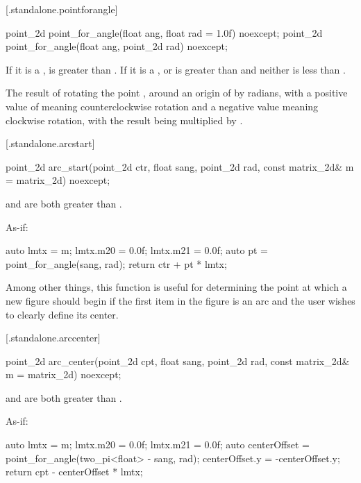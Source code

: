  [\iotwod.standalone.pointforangle] {}

%
\begin{itemdecl}
point_2d point_for_angle(float ang, float rad = 1.0f) noexcept;
point_2d point_for_angle(float ang, point_2d rad) noexcept;
\end{itemdecl}
\begin{itemdescr}
\pnum
\requires
If it is a ,  is greater than . If it is a ,  or  is greater than  and neither is less than .

\pnum
\returns
The result of rotating the point , around an origin of  by  radians, with a positive value of  meaning counterclockwise rotation and a negative value meaning clockwise rotation, with the result being multiplied by .
\end{itemdescr}

 [\iotwod.standalone.arcstart] {}

%
\begin{itemdecl}
point_2d arc_start(point_2d ctr, float sang, point_2d rad, 
  const matrix_2d& m = matrix_2d{}) noexcept;
\end{itemdecl}
\begin{itemdescr}
\pnum
\requires
{} and  are both greater than .

\pnum
\returns
As-if:
\begin{codeblock}
auto lmtx = m;
lmtx.m20 = 0.0f; lmtx.m21 = 0.0f;
auto pt = point_for_angle(sang, rad);
return ctr + pt * lmtx;
\end{codeblock}

\pnum
\begin{note}
Among other things, this function is useful for determining the point at which a new figure should begin if the first item in the figure is an arc and the user wishes to clearly define its center.
\end{note}
\end{itemdescr}

 [\iotwod.standalone.arccenter] {}

%
\begin{itemdecl}
point_2d arc_center(point_2d cpt, float sang, point_2d rad, 
  const matrix_2d& m = matrix_2d{}) noexcept;
\end{itemdecl}
\begin{itemdescr}
\pnum
\requires
{} and  are both greater than .

\pnum
\returns
As-if:
\begin{codeblock}
auto lmtx = m;
lmtx.m20 = 0.0f; lmtx.m21 = 0.0f;
auto centerOffset = point_for_angle(two_pi<float> - sang, rad);
centerOffset.y = -centerOffset.y;
return cpt - centerOffset * lmtx;
\end{codeblock}
\end{itemdescr}

